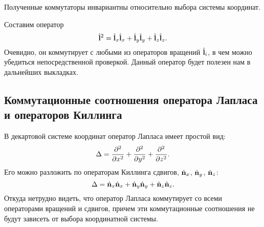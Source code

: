 \documentclass[12pt,a4paper]{article}
\begin{document}
            Полученные коммутаторы инвариантны относительно выбора системы координат.

            Составим оператор
            \begin{equation}
                \hat{\mathbf{l}}^2 = \hat{\mathbf{l}}_x \hat{\mathbf{l}}_x + \hat{\mathbf{l}}_y \hat{\mathbf{l}}_y + \hat{\mathbf{l}}_z \hat{\mathbf{l}}_z .
            \end{equation}
            Очевидно, он коммутирует с любыми из операторов вращений $\hat{\mathbf{l}}_i$, в чем можно убедиться непосредственной проверкой. Данный оператор будет полезен нам в дальнейших выкладках.


        \subsection{Коммутационные соотношения оператора Лапласа и операторов Киллинга}

            В декартовой системе координат оператор Лапласа имеет простой вид:
            \begin{equation}
                \Delta = \pdv[2]{x} + \pdv[2]{y} + \pdv[2]{z} .
            \end{equation}
            Его можно разложить по операторам Киллинга сдвигов, $\hat{\mathbf{n}}_x$, $\hat{\mathbf{n}}_y$, $\hat{\mathbf{n}}_z$:
            \begin{equation}
                \Delta = \hat{\mathbf{n}}_x\hat{\mathbf{n}}_x + \hat{\mathbf{n}}_y\hat{\mathbf{n}}_y + \hat{\mathbf{n}}_z\hat{\mathbf{n}}_z .
            \end{equation}
            Откуда нетрудно видеть, что оператор Лапласа коммутирует со всеми операторами вращений и сдвигов, причем эти коммутационные соотношения не будут зависеть от выбора координатной системы.
\end{document}
